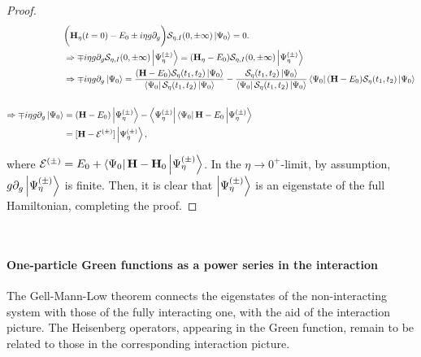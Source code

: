 \begin{proof}
\begin{equation}
    \begin{split}
        &\bigg({\bf H}_{\eta}(t=0) - E_0 \pm i \eta g \partial_{g} \bigg) \mathcal{S}_{\eta, I}(0,\pm \infty) \ket{\Psi_0} = 0. \\
        &\Rightarrow \mp i \eta g \partial_{g} \mathcal{S}_{\eta, I}(0,\pm \infty) \ket{\Psi_{\eta}^{(\pm)}}= ({\bf H}_{\eta} - E_0)  \mathcal{S}_{\eta, I}(0,\pm \infty) \ket{\Psi_{\eta}^{(\pm)}}\\
        &\Rightarrow \mp i \eta g \partial_{g} \ket{\Psi_0}= \frac{({\bf H} - E_0) \mathcal{S}_{\eta}(t_1,t_2) \ket{\Psi_0} }{ \bra{\Psi_0} \mathcal{S}_{\eta}(t_1,t_2) \ket{\Psi_0}} - \frac{\mathcal{S}_{\eta}(t_1,t_2) \ket{\Psi_0}}{ \bra{\Psi_0} \mathcal{S}_{\eta}(t_1,t_2) \ket{\Psi_0}} \bra{\Psi_0} ({\bf H} - E_0) \mathcal{S}_{\eta}(t_1,t_2) \ket{\Psi_0}  \\
\\
\Rightarrow \mp i \eta g \partial_{g} \ket{\Psi_0} &= ({{\bf H}} - E_0) \ket{\Psi_{\eta}^{(\pm)}} -  \bra{\Psi_{\eta}^{(\pm)}} \bra{\Psi_0} {{\bf H}} - E_0  \ket{\Psi_{\eta}^{(\pm)}} \\
&= [{{\bf H}} -\mathcal{E}^{(\pm)}] \ket{\Psi_{\eta}^{(\pm)}},
    \end{split}
\end{equation}

where $\mathcal{E}^{(\pm)} = E_0 + \bra{\Psi_0} {{\bf H}} - {{\bf H}}_0  \ket{\Psi_{\eta}^{(\pm)}}$. In the $\eta \rightarrow 0^+$-limit, by assumption, $g \partial_{g} \ket{\Psi_{\eta}^{(\pm)}}$ is finite. Then, it is clear that $\ket{\Psi_{\eta}^{(\pm)}}$ is an eigenstate of the full Hamiltonian, completing the proof. 

\end{proof}

\blanky \\

\paragraph{One-particle Green functions as a power series in the interaction}

The Gell-Mann-Low theorem connects the eigenstates of the non-interacting system with those of the fully interacting one, with the aid of the interaction picture. The Heisenberg operators, appearing in the Green function, remain to be related to those in the corresponding interaction picture. \\

